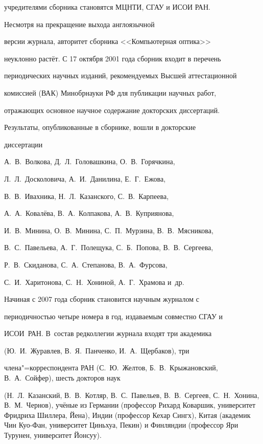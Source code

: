 учредителями сборника становятся МЦНТИ, СГАУ и ИСОИ РАН.



\smallskip



 Несмотря на прекращение выхода англоязычной

версии журнала, авторитет сборника <<Компьютерная оптика>>

неуклонно растёт. С 17 октября 2001 года сборник входит в перечень

периодических научных изданий, рекомендуемых Высшей аттестационной

комиссией (ВАК) Минобрнауки РФ для публикации научных работ,

отражающих основное научное содержание докторских диссертаций.

Результаты, опубликованные в сборнике, вошли в докторские

диссертации 

А.~В.~Волкова, Д.~Л.~Головашкина, О.~В.~Горячкина,

Л.~Л.~Досколовича, А.~И.~Данилина, Е.~Г.~Ежова,

В.~В.~Ивахника, Н.~Л.~Казанского, С.~В.~Карпеева,

А.~А.~Ковалёва, В.~А.~Колпакова, А.~В.~Куприянова,

И.~В.~Минина, О.~В.~Минина, С.~П.~Мурзина, В.~В.~Мясникова,

В.~С.~Павельева, А.~Г.~Полещука, С.~Б.~Попова, В.~В.~Сергеева,

Р.~В.~Скиданова, С.~А.~Степанова, В.~А.~Фурсова,

С.~И.~Харитонова, С.~Н.~Хониной, А.~Г.~Храмова и~др.



Начиная с 2007 года сборник становится научным журналом с

периодичностью четыре номера в год, издаваемым совместно СГАУ и

ИСОИ~РАН. В~состав редколлегии журнала входят три академика

(Ю.~И.~Журавлев, В.~Я.~Панченко, И.~А.~Щербаков), три

члена"=корреспондента РАН (С.~Ю.~Желтов, Б.~В.~Крыжановский, В.~А.~Сойфер), шесть докторов наук 

(Н.~Л.~Казанский, В.~В.~Котляр, В.~С.~Павельев, В.~В.~Сергеев, С.~Н.~Хонина, В.~М.~Чернов), учёные из Германии (профессор Рихард Коваршик, университет Фридриха Шиллера, Йена), Индии (профессор Кехар Сингх), Китая (академик Чин Куо-Фан, университет Циньхуа, Пекин) и Финляндии (профессор Яри Турунен, университет Йонсуу).

